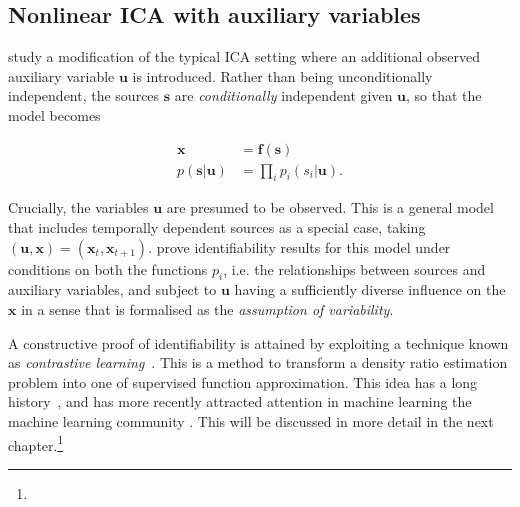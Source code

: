 





\subsection{Nonlinear ICA with auxiliary variables}\label{subsec:ica-literature-nonlinear-ica-with-aux}

\cite{hyvarinen19a} study a modification of the typical ICA setting where an additional observed auxiliary variable $\bm{u}$ is introduced.
Rather than being unconditionally independent, the sources $\bm{s}$ are \emph{conditionally} independent given $\bm{u}$, so that the model becomes

\begin{align}
\bm{x} &= \bm{f}(\bm{s}) \\
p(\bm{s}|\bm{u}) &= \prod_{i} p_i(s_i | \bm{u}).
\end{align}

Crucially, the variables $\bm{u}$ are presumed to be observed. 
This is a general model that includes temporally dependent sources as a special case, taking $(\bm{u}, \bm{x})= (\bm{x}_t,\bm{x}_{t+1})$.
\cite{hyvarinen19a} prove identifiability results for this model under conditions on both the functions $p_i$, i.e. the relationships between sources and auxiliary variables, and subject to $\bm{u}$ having a sufficiently diverse influence on the $\bm{x}$ in a sense that is formalised as the \emph{assumption of variability}.


A constructive proof of identifiability is attained by exploiting a technique known as \emph{contrastive learning}~\citep{gutmann2010noise}.
This is a method to transform a density ratio estimation problem into one of supervised function approximation. This idea has a long history~\citep{friedman2001elements}, and has more recently attracted attention in machine learning the machine learning community \citep{goodfellow2014generative, gutmann2010noise}. 
This will be discussed in more detail in the next chapter.\footnote{}


